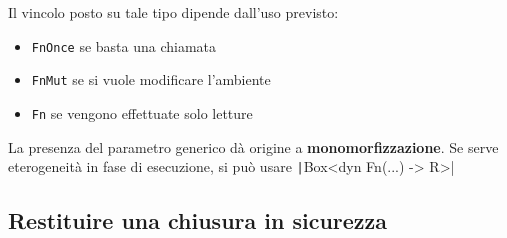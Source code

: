 Il vincolo posto su tale tipo dipende dall'uso
previsto:

\begin{itemize}
  \item \verb|FnOnce|  se basta una chiamata
  \item \verb|FnMut| se si vuole modificare l'ambiente
  \item \verb|Fn| se vengono effettuate solo letture
\end{itemize}

La presenza del parametro generico dà origine
a \textbf{monomorfizzazione}. Se serve eterogeneità in fase di esecuzione, si
può usare \texttt|Box<dyn Fn(...) -> R>|





\subsection{Restituire una chiusura in sicurezza}

